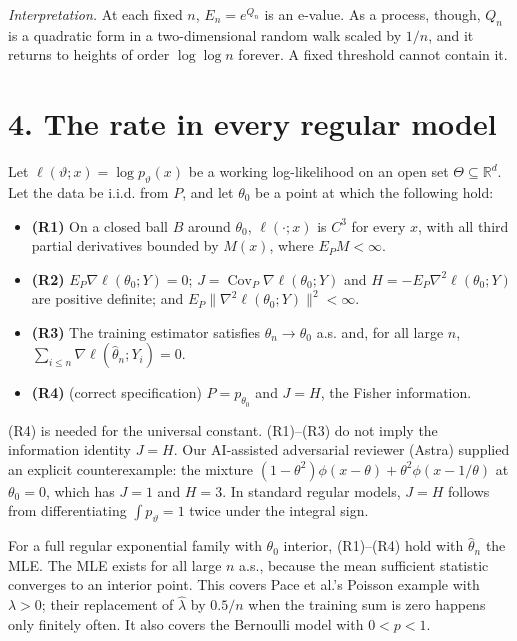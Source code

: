 \documentclass[
  10pt,
  a4paper,
]{article}
\providecommand{\tightlist}{%
  \setlength{\itemsep}{0pt}\setlength{\parskip}{0pt}}
\begin{document}
\emph{Interpretation.} At each fixed \(n\), \(E_n=e^{Q_n}\) is an
e-value. As a process, though, \(Q_n\) is a quadratic form in a
two-dimensional random walk scaled by \(1/n\), and it returns to heights
of order \(\log\log n\) forever. A fixed threshold cannot contain it.

\section{4. The rate in every regular
model}\label{the-rate-in-every-regular-model}

Let \(\ell(\vartheta;x)=\log p_\vartheta(x)\) be a working
log-likelihood on an open set \(\Theta\subseteq\mathbb R^d\). Let the
data be i.i.d. from \(P\), and let \(\theta_0\) be a point at which the
following hold:

\begin{itemize}
\tightlist
\item
  \textbf{(R1)} On a closed ball \(B\) around \(\theta_0\),
  \(\ell(\cdot;x)\) is \(C^3\) for every \(x\), with all third partial
  derivatives bounded by \(M(x)\), where \(E_PM<\infty\).
\item
  \textbf{(R2)} \(E_P\nabla\ell(\theta_0;Y)=0\);
  \(J=\operatorname{Cov}_P\nabla\ell(\theta_0;Y)\) and
  \(H=-E_P\nabla^2\ell(\theta_0;Y)\) are positive definite; and
  \(E_P\|\nabla^2\ell(\theta_0;Y)\|^2<\infty\).
\item
  \textbf{(R3)} The training estimator satisfies
  \(\hat\theta_n\to\theta_0\) a.s. and, for all large \(n\),
  \(\sum_{i\le n}\nabla\ell(\hat\theta_n;Y_i)=0\).
\item
  \textbf{(R4)} (correct specification) \(P=p_{\theta_0}\) and \(J=H\),
  the Fisher information.
\end{itemize}

(R4) is needed for the universal constant. (R1)--(R3) do not imply the
information identity \(J=H\). Our AI-assisted adversarial reviewer
(Astra) supplied an explicit counterexample: the mixture
\((1-\theta^2)\phi(x-\theta)+\theta^2\phi(x-1/\theta)\) at
\(\theta_0=0\), which has \(J=1\) and \(H=3\). In standard regular
models, \(J=H\) follows from differentiating \(\int p_\vartheta=1\)
twice under the integral sign.

For a full regular exponential family with \(\theta_0\) interior,
(R1)--(R4) hold with \(\hat\theta_n\) the MLE. The MLE exists for all
large \(n\) a.s., because the mean sufficient statistic converges to an
interior point. This covers Pace et al.'s Poisson example with
\(\lambda>0\); their replacement of \(\hat\lambda\) by \(0.5/n\) when
the training sum is zero happens only finitely often. It also covers the
Bernoulli model with \(0<p<1\).
\end{document}

